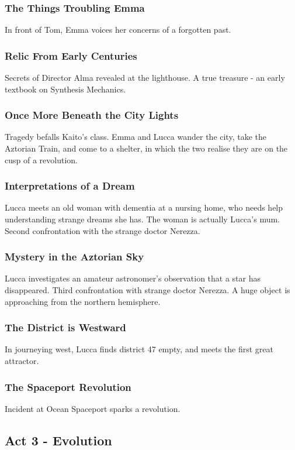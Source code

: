 \documentclass[11pt]{article}
\begin{document}
		\subsubsection{The Things Troubling Emma}
		In front of Tom, Emma voices her concerns of a forgotten past.
		\subsubsection{Relic From Early Centuries}
		Secrets of Director Alma revealed at the lighthouse.
		A true treasure - an early textbook on Synthesis Mechanics.
		\subsubsection{Once More Beneath the City Lights}
		Tragedy befalls Kaito's class.
		Emma and Lucca wander the city, take the Aztorian Train, and come to a shelter, in which the two realise they are on the cusp of a revolution.
		\subsubsection{Interpretations of a Dream}
		Lucca meets an old woman with dementia at a nursing home, who needs help understanding strange dreams she has. 
		The woman is actually Lucca's mum.
		Second confrontation with the strange doctor Nerezza.
		\subsubsection{Mystery in the Aztorian Sky}
		Lucca investigates an amateur astronomer's observation that a star has disappeared.
		Third confrontation with strange doctor Nerezza.
		A huge object is approaching from the northern hemisphere.
		\subsubsection{The District is Westward}
		In journeying west, Lucca finds district 47 empty, and meets the first great attractor.
		\subsubsection{The Spaceport Revolution}
		Incident at Ocean Spaceport sparks a revolution.
	\newpage




	\subsection{Act 3 - Evolution}
\end{document}
